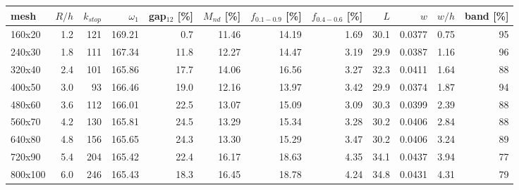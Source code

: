 \setlength{\tabcolsep}{3.5pt}
\begin{tabular}{lrrrrrrrrrrr}
\toprule
mesh & $R/h$ & $k_{stop}$ & $\omega_1$ & gap$_{12}$ [\%] & $M_{nd}$ [\%] & $f_{0.1-0.9}$ [\%] & $f_{0.4-0.6}$ [\%] & $L$ & $w$ & $w/h$ & band [\%] \\
\midrule
160x20 & 1.2 & 121 & 169.21 & 0.7 & 11.46 & 14.19 & 1.69 & 30.1 & 0.0377 & 0.75 & 95 \\
240x30 & 1.8 & 111 & 167.34 & 11.8 & 12.27 & 14.47 & 3.19 & 29.9 & 0.0387 & 1.16 & 96 \\
320x40 & 2.4 & 101 & 165.86 & 17.7 & 14.06 & 16.56 & 3.27 & 32.3 & 0.0411 & 1.64 & 88 \\
400x50 & 3.0 & 93 & 166.46 & 19.0 & 12.16 & 13.97 & 3.42 & 29.9 & 0.0374 & 1.87 & 94 \\
480x60 & 3.6 & 112 & 166.01 & 22.5 & 13.07 & 15.09 & 3.09 & 30.3 & 0.0399 & 2.39 & 88 \\
560x70 & 4.2 & 130 & 165.81 & 24.5 & 13.29 & 15.34 & 3.28 & 30.2 & 0.0406 & 2.84 & 88 \\
640x80 & 4.8 & 156 & 165.65 & 24.3 & 13.30 & 15.29 & 3.47 & 30.2 & 0.0406 & 3.24 & 89 \\
720x90 & 5.4 & 204 & 165.42 & 22.4 & 16.17 & 18.63 & 4.35 & 34.1 & 0.0437 & 3.94 & 77 \\
800x100 & 6.0 & 246 & 165.43 & 18.3 & 16.45 & 18.78 & 4.24 & 34.8 & 0.0431 & 4.31 & 79 \\
\bottomrule
\end{tabular}
